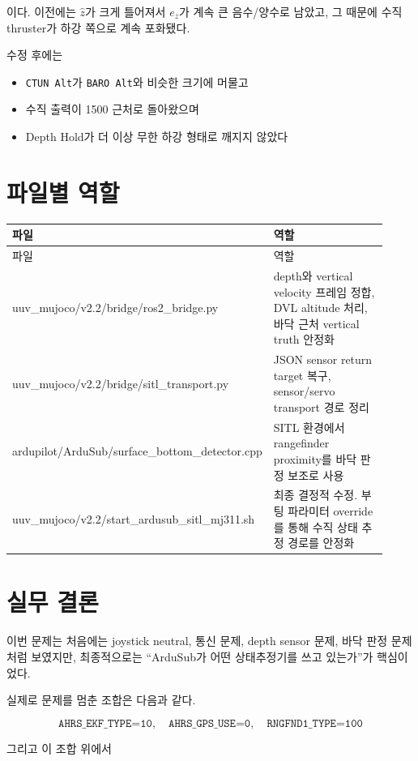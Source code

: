 \documentclass[11pt]{article}
\begin{document}
이다. 이전에는 \(\hat{z}\)가 크게 틀어져서 \(e_z\)가 계속 큰 음수/양수로
남았고, 그 때문에 수직 thruster가 하강 쪽으로 계속 포화됐다.

수정 후에는

\begin{itemize}[leftmargin=1.5em]
\item \texttt{CTUN Alt}가 \texttt{BARO Alt}와 비슷한 크기에 머물고
\item 수직 출력이 1500 근처로 돌아왔으며
\item Depth Hold가 더 이상 무한 하강 형태로 깨지지 않았다
\end{itemize}

\section{파일별 역할}

\begin{longtable}{>{\ttfamily}p{0.40\linewidth} p{0.52\linewidth}}
\toprule
파일 & 역할 \\
\midrule
\endfirsthead
\toprule
파일 & 역할 \\
\midrule
\endhead
uuv\_mujoco/v2.2/bridge/ros2\_bridge.py & depth와 vertical velocity 프레임 정합, DVL altitude 처리, 바닥 근처 vertical truth 안정화 \\
uuv\_mujoco/v2.2/bridge/sitl\_transport.py & JSON sensor return target 복구, sensor/servo transport 경로 정리 \\
ardupilot/ArduSub/surface\_bottom\_detector.cpp & SITL 환경에서 rangefinder proximity를 바닥 판정 보조로 사용 \\
uuv\_mujoco/v2.2/start\_ardusub\_sitl\_mj311.sh & 최종 결정적 수정. 부팅 파라미터 override를 통해 수직 상태 추정 경로를 안정화 \\
\bottomrule
\end{longtable}

\section{실무 결론}

이번 문제는 처음에는 joystick neutral, 통신 문제, depth sensor 문제,
바닥 판정 문제처럼 보였지만, 최종적으로는 ``ArduSub가 어떤 상태추정기를
쓰고 있는가''가 핵심이었다.

실제로 문제를 멈춘 조합은 다음과 같다.

\[
\texttt{AHRS\_EKF\_TYPE=10},\quad
\texttt{AHRS\_GPS\_USE=0},\quad
\texttt{RNGFND1\_TYPE=100}
\]

그리고 이 조합 위에서
\end{document}
